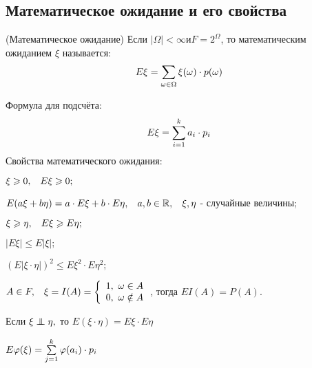 \begin{multicols}{2}
    \subsection*{Математическое ожидание и его свойства}
    \begin{definition}{(Математическое ожидание)}{}
            Если $|\Omega| < \infty и  F = 2^{\Omega}$, то математическим ожиданием $\xi$ называется:
            \[
            E\xi = \suml_{\omega \in \Omega} \xi(\omega)\cdot p(\omega)
            \]
    \end{definition}
    Формула для подсчёта:
    \[
        E\xi = \suml_{i = 1}^k a_i \cdot p_i
    \]
    Свойства математического ожидания:
    \begin{enumerate*}
        \item $\xi \geq 0, \hspace{0.3cm} E\xi \geq 0;$
        \item $E(a\xi + b \eta) = a \cdot E\xi +b \cdot E\eta,  \hspace{0.3cm} a,b \in \R,  \hspace{0.3cm} \xi, \eta$ - случайные величины; 
        \item $\xi \geq \eta, \hspace{0.3cm} E\xi \geq E\eta; $
        \item $|E\xi| \leq E|\xi|;$
        \item $(E|\xi \cdot \eta|)^2 \leq E\xi^2 \cdot E\eta^2;$
        \item $A \in F,\hspace{0.3cm} \xi = I(A) = 
        \left\{\begin{array}{c}
            1, \ \omega \in A \\
            0, \ \omega \notin A
        \end{array}\right.$, тогда $EI(A) = P(A).$
        \item Если $\xi \independent \eta,$ то $E(\xi \cdot \eta) = E\xi \cdot E\eta$
        \item $E \phi(\xi) = \suml_{j = 1}^k \phi(a_i) \cdot p_i$
    \end{enumerate*}

\end{multicols}
